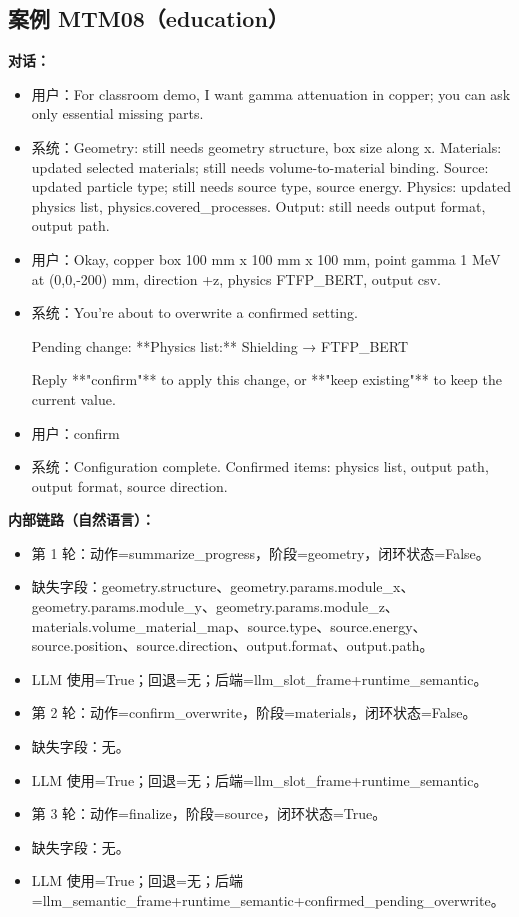 \documentclass[11pt]{ctexart}
\begin{document}
\subsection{案例 MTM08（education）}
\textbf{对话：}
\begin{itemize}
\item 用户：For classroom demo, I want gamma attenuation in copper; you can ask only essential missing parts.
\item 系统：Geometry: still needs geometry structure, box size along x. Materials: updated selected materials; still needs volume-to-material binding. Source: updated particle type; still needs source type, source energy. Physics: updated physics list, physics.covered\_processes. Output: still needs output format, output path.
\item 用户：Okay, copper box 100 mm x 100 mm x 100 mm, point gamma 1 MeV at (0,0,-200) mm, direction +z, physics FTFP\_BERT, output csv.
\item 系统：You're about to overwrite a confirmed setting.

Pending change:  
**Physics list:** Shielding → FTFP\_BERT

Reply **"confirm"** to apply this change, or **"keep existing"** to keep the current value.
\item 用户：confirm
\item 系统：Configuration complete. Confirmed items: physics list, output path, output format, source direction.
\end{itemize}
\textbf{内部链路（自然语言）：}
\begin{itemize}
\item 第 1 轮：动作=summarize\_progress，阶段=geometry，闭环状态=False。
\item 缺失字段：geometry.structure、geometry.params.module\_x、geometry.params.module\_y、geometry.params.module\_z、materials.volume\_material\_map、source.type、source.energy、source.position、source.direction、output.format、output.path。
\item LLM 使用=True；回退=无；后端=llm\_slot\_frame+runtime\_semantic。
\item 第 2 轮：动作=confirm\_overwrite，阶段=materials，闭环状态=False。
\item 缺失字段：无。
\item LLM 使用=True；回退=无；后端=llm\_slot\_frame+runtime\_semantic。
\item 第 3 轮：动作=finalize，阶段=source，闭环状态=True。
\item 缺失字段：无。
\item LLM 使用=True；回退=无；后端=llm\_semantic\_frame+runtime\_semantic+confirmed\_pending\_overwrite。
\end{itemize}
\end{document}
